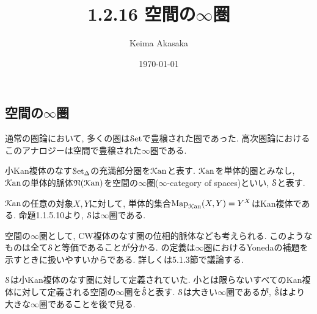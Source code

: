 \documentclass[uplatex, a4paper, 14Q, dvipdfmx]{jsreport}
\title{1.2.16 空間の\texorpdfstring{$\infty$}{infty}圏}
\author{Keima Akasaka}
\date{\today}
\begin{document}

\setcounter{chapter}{1}
\setcounter{section}{2} 
\setcounter{subsection}{15}   
\setcounter{subsubsection}{1}

\subsection{空間の\texorpdfstring{$\infty$}{infty}圏}

通常の圏論において, 多くの圏は$\Set$で豊穣された圏であった. 
高次圏論におけるこのアナロジーは空間で豊穣された$\infty$圏である.

\begin{definition} \label{def.1.2.16.1}
  小Kan複体のなす$\sSet$の充満部分圏を$\Kan$と表す. 
  $\Kan$を単体的圏とみなし, $\Kan$の単体的脈体$\mathfrak{N}(\Kan)$を空間の$\infty$圏($\infty$-category of spaces)といい, $\S$と表す. 
\end{definition}

\begin{remark} \label{rem.1.2.16.2}
  $\Kan$の任意の対象$X,Y$に対して, 単体的集合$\Map_{\Kan}(X,Y) = Y^X$はKan複体である. 
  命題1.1.5.10より, $\S$は$\infty$圏である. 
\end{remark}

\begin{remark} \label{rem.1.2.16.3}
  空間の$\infty$圏として, CW複体のなす圏の位相的脈体なども考えられる. 
  このようなものは全て$\S$と等価であることが分かる. 
  の定義は$\infty$圏におけるYonedaの補題を示すときに扱いやすいからである. 
  詳しくは5.1.3節で議論する.
\end{remark}

\begin{remark} \label{rem.1.2.16.4}
  $\S$は小Kan複体のなす圏に対して定義されていた. 
  小とは限らないすべてのKan複体に対して定義される空間の$\infty$圏を$\hat{\S}$と表す. 
  $\S$は大きい$\infty$圏であるが, $\hat{\S}$はより大きな$\infty$圏であることを後で見る. 
\end{remark}
\end{document}
